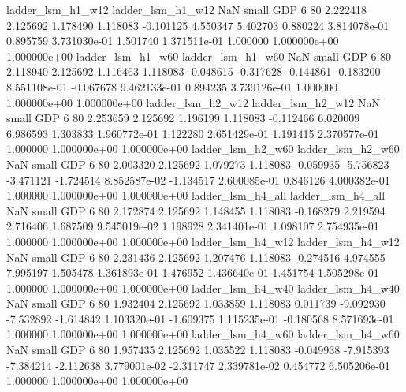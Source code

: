        ladder_lsm_h1_w12        ladder_lsm_h1_w12                   NaN      small      GDP                 6 80 2.222418       2.125692 1.178490       1.118083   -0.101125      4.550347      5.402703     0.880224   3.814078e-01  0.895759 3.731030e-01     1.501740   1.371511e-01            1.000000    1.000000e+00        1.000000e+00
       ladder_lsm_h1_w60        ladder_lsm_h1_w60                   NaN      small      GDP                 6 80 2.118940       2.125692 1.116463       1.118083   -0.048615     -0.317628     -0.144861    -0.183200   8.551108e-01 -0.067678 9.462133e-01     0.894235   3.739126e-01            1.000000    1.000000e+00        1.000000e+00
       ladder_lsm_h2_w12        ladder_lsm_h2_w12                   NaN      small      GDP                 6 80 2.253659       2.125692 1.196199       1.118083   -0.112466      6.020009      6.986593     1.303833   1.960772e-01  1.122280 2.651429e-01     1.191415   2.370577e-01            1.000000    1.000000e+00        1.000000e+00
       ladder_lsm_h2_w60        ladder_lsm_h2_w60                   NaN      small      GDP                 6 80 2.003320       2.125692 1.079273       1.118083   -0.059935     -5.756823     -3.471121    -1.724514   8.852587e-02 -1.134517 2.600085e-01     0.846126   4.000382e-01            1.000000    1.000000e+00        1.000000e+00
       ladder_lsm_h4_all        ladder_lsm_h4_all                   NaN      small      GDP                 6 80 2.172874       2.125692 1.148455       1.118083   -0.168279      2.219594      2.716406     1.687509   9.545019e-02  1.198928 2.341401e-01     1.098107   2.754935e-01            1.000000    1.000000e+00        1.000000e+00
       ladder_lsm_h4_w12        ladder_lsm_h4_w12                   NaN      small      GDP                 6 80 2.231436       2.125692 1.207476       1.118083   -0.274516      4.974555      7.995197     1.505478   1.361893e-01  1.476952 1.436640e-01     1.451754   1.505298e-01            1.000000    1.000000e+00        1.000000e+00
       ladder_lsm_h4_w40        ladder_lsm_h4_w40                   NaN      small      GDP                 6 80 1.932404       2.125692 1.033859       1.118083    0.011739     -9.092930     -7.532892    -1.614842   1.103320e-01 -1.609375 1.115235e-01    -0.180568   8.571693e-01            1.000000    1.000000e+00        1.000000e+00
       ladder_lsm_h4_w60        ladder_lsm_h4_w60                   NaN      small      GDP                 6 80 1.957435       2.125692 1.035522       1.118083   -0.049938     -7.915393     -7.384214    -2.112638   3.779001e-02 -2.311747 2.339781e-02     0.454772   6.505206e-01            1.000000    1.000000e+00        1.000000e+00
